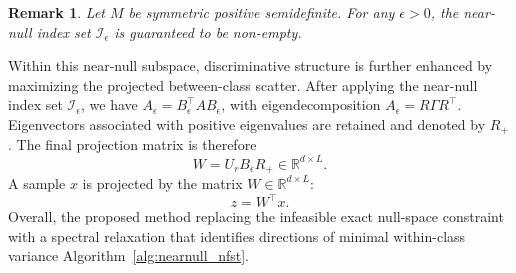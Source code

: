 \documentclass[final,twocolumn,10pt]{elsarticle}
\newtheorem{theorem}{Theorem}
\newtheorem{remark}{Remark}
\begin{document}
\begin{remark}
Let \(M\) be symmetric positive semidefinite. For any \(\epsilon > 0\), the near-null index set \(\mathcal{I}_\epsilon\) is guaranteed to be non-empty.
\end{remark}
Within this near-null subspace, discriminative structure is further enhanced by maximizing the projected between-class scatter. After applying the near-null index set \(\mathcal{I}_\epsilon\), we have \(A_\epsilon = B_\epsilon^\top A B_\epsilon\), with eigendecomposition \(A_\epsilon = R \Gamma R^\top\). Eigenvectors associated with positive eigenvalues are retained and denoted by \(R_+\). The final projection matrix is therefore
\begin{equation}
W = U_r B_\epsilon R_+ \in \mathbb{R}^{d\times L}.
\label{eq:projection_XXX_revised}
\end{equation}
A sample \(x\) is projected by the matrix \(W \in \mathbb{R}^{d \times L}\):
\[
z = W^\top x .
\]
Overall, the proposed method replacing the infeasible exact null-space constraint with a spectral relaxation that identifies directions of minimal within-class variance Algorithm~\ref{alg:nearnull_nfst}.  









\end{document}
